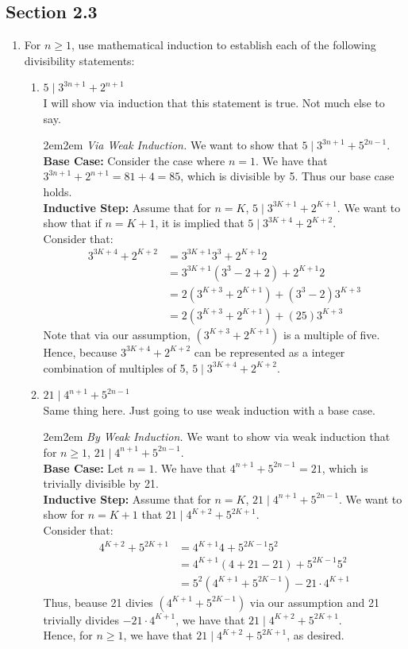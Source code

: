\documentclass[10pt,oneside]{book}
\newcommand{\gspc}{\vspace{0.13cm}} %
\newcommand{\gline}{\gspc\\} %
\let\endoldproof\endproof
\renewenvironment{proof}[1][\proofname]
  {\vspace{0.2cm}\begin{adjustwidth}{2em}{2em}
   \oldproof[#1]}
  {\endoldproof
\end{adjustwidth}}
\begin{document}
\subsection*{Section 2.3}
\begin{enumerate}
	\item [4.] For $n \ge 1$, use mathematical induction to establish each of the following divisibility statements:
	\begin{enumerate}
		\item [(c)] $5\mid 3^{3n+1}+2^{n+1}$\gline
		I will show via induction that this statement is true. Not much else to say.
		\begin{proof}
			\textit{Via Weak Induction. }We want to show that $5\mid 3^{3n+1}+5^{2n-1}$.\gline
			\textbf{Base Case: }Consider the case where $n = 1$. We have that $3^{3n+1} + 2^{n+1}=81+4 = 85$, which is divisible by 5. Thus our base case holds.\gline
			\textbf{Inductive Step: } Assume that for $n=K$, $5\mid 3^{3K+1}+2^{K+1}$. We want to show that if $n = K+1$, it is implied that $5\mid 3^{3K+4}+2^{K+2}$.\gline
			Consider that:
			\begin{align*}
				3^{3K+4}+2^{K+2} &= 3^{3K+1}3^3+2^{K+1}2\\
				&= 3^{3K+1}(3^3 - 2 + 2)+2^{K+1}2\\
				&= 2(3^{K+3} + 2^{K+1})+(3^3-2)3^{K+3}\\
				&= 2(3^{K+3} + 2^{K+1})+(25)3^{K+3}
			\end{align*}
			Note that via our assumption, $(3^{K+3} + 2^{K+1})$ is a multiple of five. Hence, because $3^{3K+4}+2^{K+2}$ can be represented as a integer combination of multiples of 5, $ 5\mid 3^{3K+4}+2^{K+2}$.
		\end{proof}
		\item $21\mid 4^{n+1}+5^{2n-1}$\gline
		Same thing here. Just going to use weak induction with a base case.
		\begin{proof}
			\textit{By Weak Induction.} We want to show via weak induction that for $n\ge 1$, $21\mid 4^{n+1}+5^{2n-1}$. \gline
			\textbf{Base Case: }Let $n=1$. We have that $4^{n+1}+5^{2n-1} = 21$, which is trivially divisible by 21. \gline
			\textbf{Inductive Step:} Assume that for $n =K$, $21\mid 4^{n+1}+5^{2n-1}$. We want to show for $n = K+1$ that $21\mid 4^{K+2}+5^{2K+1}$.\gline
			Consider that:
			\begin{align*}
				4^{K+2}+5^{2K+1}&= 4^{K+1}4 + 5^{2K-1}5^2\\
				&= 4^{K+1}(4+21-21) + 5^{2K-1}5^2\\
				&= 5^2(4^{K+1}+5^{2K-1})-21\cdot4^{K+1}
			\end{align*}
			Thus, beause 21 divies $(4^{K+1}+5^{2K-1})$ via our assumption and 21 trivially divides $-21\cdot4^{K+1}$, we have that $21\mid 4^{K+2}+5^{2K+1}$.\gline
			Hence, for $n\ge 1$, we have that $21\mid 4^{K+2}+5^{2K+1}$, as desired.
		\end{proof}
	\end{enumerate}
\end{enumerate}
\end{document}
